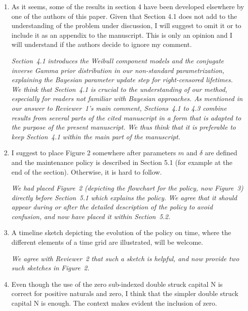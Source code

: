 \documentclass[authoryear]{elsarticle}
\begin{document}
\begin{enumerate}
\item As it seems, some of the results in section 4 have been developed elsewhere by one of the authors of this paper. Given that Section 4.1 does not add to the understanding of the problem under discussion, I will suggest to omit it or to include it as an appendix to the manuscript. This is only an opinion and I will understand if the authors decide to ignore my comment.

\smallskip

\emph{Section~4.1 introduces the Weibull component models
and the conjugate inverse Gamma prior distribution in our non-standard parametrization,
explaining the Bayesian parameter update step for right-censored lifetimes.
We think that Section~4.1 is crucial to the understanding of our method,
especially for readers not familiar with Bayesian approaches.
As mentioned in our answer to Reviewer~1's main comment,
Sections~4.1 to 4.3 combine results from several parts of the cited manuscript
in a form that is adapted to the purpose of the present manuscript.
We thus think that it is preferable to keep Section~4.1 within the main part of the manuscript.}

\item I suggest to place Figure 2 somewhere after parameters $m$ and $\delta$ are defined and the maintenance policy is described in Section 5.1 (for example at the end of the section). Otherwise, it is hard to follow.

\smallskip

\emph{We had placed Figure~2 (depicting the flowchart for the policy, now Figure~3) directly before Section~5.1 which explains the policy.
We agree that it should appear during or after the detailed description of the policy to avoid confusion,
and now have placed it within Section~5.2.}

\item A timeline sketch depicting the evolution of the policy on time, where the different elements of a time grid are illustrated, will be welcome.

\smallskip

\emph{We agree with Reviewer~2 that such a sketch is helpful, and now provide two such sketches in Figure~2.}

\item Even though the use of the zero sub-indexed double struck capital N is correct for positive naturals and zero, I think that the simpler double struck capital N is enough. The context makes evident the inclusion of zero.


\end{enumerate}
\end{document}
